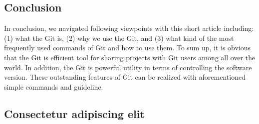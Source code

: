 \documentclass{article}
\begin{document}
\section{Conclusion}
In conclusion, we navigated following viewpoints with this short article including: (1) what the Git is, (2) why we use the Git, and (3) what kind of the most frequently used commands of Git and how to use them. To sum up, it is obvious that the Git is efficient tool for sharing projects with Git users among all over the world. In addition, the Git is powerful utility in terms of controlling the software version. These outstanding features of Git can be realized with aforementioned simple commands and guideline.

\begin{appendices}
  \chapter{Consectetur adipiscing elit}
\end{appendices}
\end{document}

